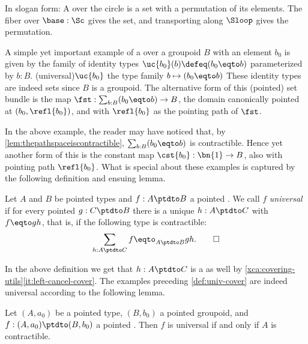 In slogan form: A \covering over the circle is a set with
a permutation of its elements.
The fiber over $\base:\Sc$ gives the set,
and transporting along $\Sloop$ gives the permutation.

\begin{example}\label{def:universalcover}
A simple yet important example of a \covering over a groupoid
$B$ with an element $b_0$ is given by the family of identity types
$\uc{b_0}(b) \defeq (b_0 \eqto b)$ parameterized by $b:B$.
\glossary(universal){$\protect\uc{b_0}$}%
{the type family $b \mapsto (b_0 \protect\eqto b)$}
These identity types are indeed sets since $B$ is a groupoid.
The alternative form
of this (pointed) set bundle is the map $\fst: \sum_{b:B}(b_0\eqto b)\to B$,
the domain canonically pointed at $(b_0,\refl{b_0})$, and with
$\refl{b_0}$ as the pointing path of $\fst$.

In the above example, the reader may have noticed that,
by \cref{lem:thepathspaceiscontractible},
$\sum_{b:B}(b_0\eqto b)$ is contractible. Hence yet another
form of this \covering is the constant map
$\cst{b_0}:\bn{1}\to B$, also with pointing path $\refl{b_0}$.
What is special about these examples is captured by the
following definition and ensuing lemma.
\end{example}

\begin{definition}\label{def:univ-cover}
Let $A$ and $B$ be pointed types and $f: A\ptdto B$ a pointed \covering.
We call $f$ \emph{universal} if for every pointed \covering $g: C\ptdto B$
there is a unique $h: A\ptdto C$ with $f\eqto gh$, that is, if
the following type is contractible:
\[\sum_{h: A\ptdto C} f\eqto_{A\ptdto B} gh.\qedhere\]
\end{definition}

In the above definition we get that $h: A\ptdto C$ is a
\covering as well by \cref{xca:covering-utils}\ref{it:left-cancel-cover}.
The examples preceding \cref{def:univ-cover} are indeed universal
\coverings according to the following lemma.

\begin{lemma}\label{lem:univ-cover-of-groupoid}
Let $(A,a_0)$ be a pointed type, $(B,b_0)$ a pointed
groupoid, and $f : (A,a_0)\ptdto (B,b_0)$ a pointed \covering.
Then $f$ is universal if and only if $A$ is contractible.
\end{lemma}

